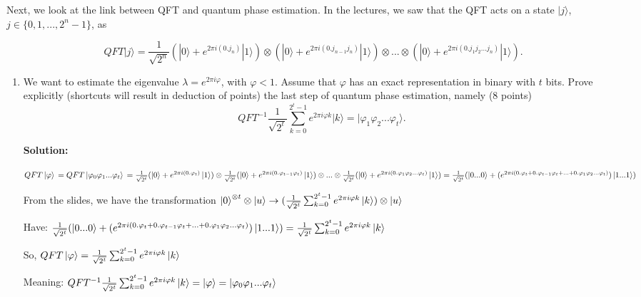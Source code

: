 \documentclass[12pt]{article}
\begin{document}
Next, we look at the link between QFT and quantum phase estimation. In the lectures, we saw that the QFT acts on a state $|j\rangle$, $j \in \{0, 1, ..., 2^{n} - 1\}$, as

$$
    QFT|j\rangle = \frac{1}{\sqrt{2^n}}(|0\rangle + e^{2\pi i(0.j_n)}|1\rangle) \otimes (|0\rangle + e^{2\pi i(0.j_{n-1}j_n)}|1\rangle) \otimes ... \otimes (|0\rangle + e^{2\pi i(0.j_1j_2...j_n)}|1\rangle).
$$

\begin{enumerate}[start=4]
    \item We want to estimate the eigenvalue $\lambda = e^{2\pi i\varphi}$, with $\varphi < 1$. Assume that $\varphi$ has an exact representation in binary with $t$ bits. Prove explicitly (shortcuts will result in deduction of points) the last step of quantum phase estimation, namely (8 points)
          $$
              QFT^{-1}\frac{1}{\sqrt{2^t}}\sum_{k=0}^{2^t-1}e^{2\pi i\varphi k}|k\rangle = |\varphi_1\varphi_2...\varphi_t\rangle.
          $$


          \textbf{Solution:}

          $QFT\ket{\varphi}
              \\=QFT\ket{\varphi_0\varphi_1...\varphi_t}
              \\=\frac{1}{\sqrt{2^t}}(\ket{0}+e^{2\pi i(0.\varphi_t)}\ket{1})\otimes \frac{1}{\sqrt{2^t}}(\ket{0}+e^{2\pi i(0.\varphi_{t-1}\varphi_{t})}\ket{1}) \otimes ... \otimes \frac{1}{\sqrt{2^t}}(\ket{0}+e^{2\pi i(0.\varphi_{1}\varphi_{2}...\varphi_{t})}\ket{1})
              \\=\frac{1}{\sqrt{2^t}}(\ket{0...0}+(e^{2\pi i(0.\varphi_t+0.\varphi_{t-1}\varphi_{t}+...+0.\varphi_{1}\varphi_{2}...\varphi_{t})})\ket{1...1})
          $

          From the slides, we have the transformation $\ket{0}^{\otimes t}\otimes  \ket{u} \rightarrow (\frac{1}{\sqrt{2^t}}\sum_{k=0}^{2^t-1}e^{2\pi i\varphi k}\ket{k})\otimes \ket{u}$

          Have:
          $\frac{1}{\sqrt{2^t}}(\ket{0...0}+(e^{2\pi i(0.\varphi_t+0.\varphi_{t-1}\varphi_{t}+...+0.\varphi_{1}\varphi_{2}...\varphi_{t})})\ket{1...1})\\
              =\frac{1}{\sqrt{2^t}}\sum_{k=0}^{2^t-1}e^{2\pi i\varphi k}\ket{k}$



          So, $QFT\ket{\varphi} = \frac{1}{\sqrt{2^t}}\sum_{k=0}^{2^t-1}e^{2\pi i\varphi k}\ket{k}$

          Meaning: $QFT^{-1}\frac{1}{\sqrt{2^t}}\sum_{k=0}^{2^t-1}e^{2\pi i\varphi k}\ket{k} = \ket{\varphi} = \ket{\varphi_0\varphi_1...\varphi_t}$






\end{enumerate}
\end{document}
